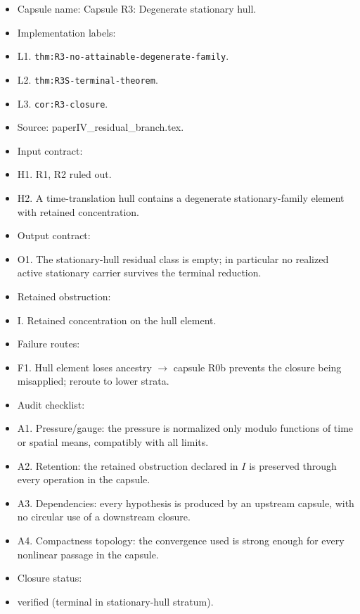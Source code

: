\documentclass[11pt]{amsart}
\begin{document}
\begin{itemize}
  \item Capsule name: Capsule R3: Degenerate stationary hull.
  \item Implementation labels:
  \item L1. \texttt{thm:R3-no-attainable-degenerate-family}.
  \item L2. \texttt{thm:R3S-terminal-theorem}.
  \item L3. \texttt{cor:R3-closure}.
  \item Source: paperIV\_residual\_branch.tex.
  \item Input contract:
  \item H1. R1, R2 ruled out.
  \item H2. A time-translation hull contains a degenerate stationary-family element with retained concentration.
  \item Output contract:
  \item O1. The stationary-hull residual class is empty; in particular no realized active stationary carrier survives the terminal reduction.
  \item Retained obstruction:
  \item I. Retained concentration on the hull element.
  \item Failure routes:
  \item F1. Hull element loses ancestry $\to$ capsule R0b prevents the closure being misapplied; reroute to lower strata.
  \item Audit checklist:
  \item A1. Pressure/gauge: the pressure is normalized only modulo functions of time or spatial means, compatibly with all limits.
  \item A2. Retention: the retained obstruction declared in $I$ is preserved through every operation in the capsule.
  \item A3. Dependencies: every hypothesis is produced by an upstream capsule, with no circular use of a downstream closure.
  \item A4. Compactness topology: the convergence used is strong enough for every nonlinear passage in the capsule.
  \item Closure status:
  \item verified (terminal in stationary-hull stratum).
\end{itemize}
\end{document}
